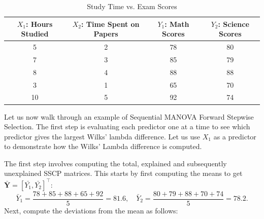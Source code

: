 \documentclass[11pt]{report} %
\begin{document}
\setlength{\tabcolsep}{4pt} %
\begin{table}[H]
    \centering
    \begin{tabular}{|c|c|c|c|}
        \hline
        \( X_1 \): Hours Studied & \( X_2 \): Time Spent on Papers & \( Y_1 \): Math Scores & \( Y_2 \): Science Scores\\
        \hline
        5  & 2  & 78 & 80 \\
        7  & 3  & 85 & 79 \\
        8  & 4  & 88 & 88 \\
        3  & 1  & 65 & 70 \\
        10 & 5  & 92 & 74 \\
        \hline
    \end{tabular}
    \caption{Study Time vs. Exam Scores}
    \label{tab:study_scores3}
\end{table}

\noindent Let us now walk through an example of Sequential MANOVA Forward Stepwise Selection. The first step is evaluating each predictor one at a time to see which predictor gives the largest Wilks' lambda difference. Let us use $X_1$ as a predictor to demonstrate how the Wilks' Lambda difference is computed.

The first step involves computing the total, explained and subsequently unexplained SSCP matrices. This starts by first computing the means to get $\bar{\mathbf{Y}} = [\bar{Y_1}, \bar{Y_2}]^\top$:
\[
\bar{Y}_1 = \frac{78 + 85 + 88 + 65 + 92}{5} = 81.6, \quad
\bar{Y}_2 = \frac{80+79+88+70+74}{5} = 78.2.
\]
Next, compute the deviations from the mean as follows:
\end{document}

